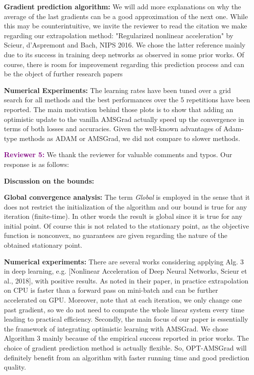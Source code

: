 \documentclass{article}
\begin{document}
\textbf{Gradient prediction algorithm:} We will add more explanations on why the average of the last gradients can be a good approximation of the next one. While this may be counterintuitive, we invite the reviewer to read the citation we make regarding our extrapolation method: "Regularized nonlinear acceleration" by Scieur, d'Aspremont and Bach, NIPS 2016.
We chose the latter reference mainly due to its success in training deep networks as observed in some prior works.
Of course, there is room for improvement regarding this prediction process and can be the object of further research papers

\textbf{Numerical Experiments:} The learning rates have been tuned over a grid search for all methods and the best performances over the 5 repetitions have been reported.
The main motivation behind those plots is to show that adding an optimistic update to the vanilla AMSGrad actually speed up the convergence in terms of both losses and accuracies.
Given the well-known advantages of Adam-type methods as ADAM or AMSGrad, we did not compare to slower methods.

\vspace{0.02in}

\textbf{\textcolor{purple}{Reviewer 5:}} We thank the reviewer for valuable comments and typos. Our response is as follows:\vspace{-5pt}

\textbf{Discussion on the bounds:}

\textbf{Global convergence analysis:} The term \emph{Global} is employed in the sense that it does not restrict the initialization of the algorithm and our bound is true for any iteration (finite-time). In other words the result is global since it is true for any initial point. Of course this is not related to the stationary point, as the objective function is nonconvex, no guarantees are given regarding the nature of the obtained stationary point.


\textbf{Numerical experiments:} There are several works considering applying Alg. 3 in deep learning, e.g. [Nonlinear Acceleration of Deep Neural Networks, Scieur et al., 2018], with positive results. 
As noted in their paper, in practice extrapolation on CPU is faster than a forward pass on mini-batch and can be further accelerated on GPU. 
Moreover, note that at each iteration, we only change one past gradient, so we do not need to compute the whole linear system every time leading to practical efficiency. 
Secondly, the main focus of our paper is essentially the framework of integrating optimistic learning with AMSGrad. 
We chose Algorithm 3 mainly because of the empirical success reported in prior works. The choice of gradient prediction method is actually flexible. 
So, OPT-AMSGrad will definitely benefit from an algorithm with faster running time and good prediction quality. 
\end{document}
